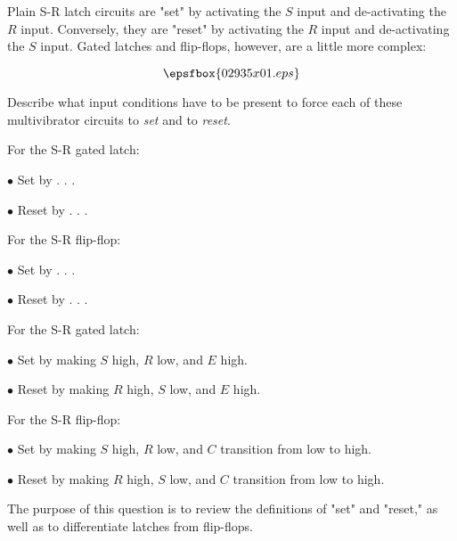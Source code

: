 

Plain S-R latch circuits are "set" by activating the $S$ input and de-activating the $R$ input.  Conversely, they are "reset" by activating the $R$ input and de-activating the $S$ input.  Gated latches and flip-flops, however, are a little more complex:

$$\epsfbox{02935x01.eps}$$

Describe what input conditions have to be present to force each of these multivibrator circuits to {\it set} and to {\it reset}.

\vskip 10pt

For the S-R gated latch:

\medskip
\item{$\bullet$} Set by . . .
\item{$\bullet$} Reset by . . .
\medskip

\vskip 10pt

For the S-R flip-flop:

\medskip
\item{$\bullet$} Set by . . .
\item{$\bullet$} Reset by . . .
\medskip







For the S-R gated latch:

\medskip
\item{$\bullet$} Set by making $S$ high, $R$ low, and $E$ high.
\item{$\bullet$} Reset by making $R$ high, $S$ low, and $E$ high.
\medskip

\vskip 10pt

For the S-R flip-flop:

\medskip
\item{$\bullet$} Set by making $S$ high, $R$ low, and $C$ transition from low to high.
\item{$\bullet$} Reset by making $R$ high, $S$ low, and $C$ transition from low to high.
\medskip







The purpose of this question is to review the definitions of "set" and "reset," as well as to differentiate latches from flip-flops.





